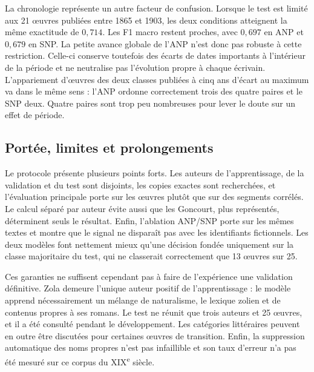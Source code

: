 La chronologie représente un autre facteur de confusion. Lorsque le test est limité aux 21 œuvres publiées entre 1865 et 1903, les deux conditions atteignent la même exactitude de $0{,}714$. Les F1 macro restent proches, avec $0{,}697$ en ANP et $0{,}679$ en SNP. La petite avance globale de l'ANP n'est donc pas robuste à cette restriction. Celle-ci conserve toutefois des écarts de dates importants à l'intérieur de la période et ne neutralise pas l'évolution propre à chaque écrivain. L'appariement d'œuvres des deux classes publiées à cinq ans d'écart au maximum va dans le même sens : l'ANP ordonne correctement trois des quatre paires et le SNP deux. Quatre paires sont trop peu nombreuses pour lever le doute sur un effet de période.

\subsection{Portée, limites et prolongements}

Le protocole présente plusieurs points forts. Les auteurs de l'apprentissage, de la validation et du test sont disjoints, les copies exactes sont recherchées, et l'évaluation principale porte sur les œuvres plutôt que sur des segments corrélés. Le calcul séparé par auteur évite aussi que les Goncourt, plus représentés, déterminent seuls le résultat. Enfin, l'ablation ANP/SNP porte sur les mêmes textes et montre que le signal ne disparaît pas avec les identifiants fictionnels. Les deux modèles font nettement mieux qu'une décision fondée uniquement sur la classe majoritaire du test, qui ne classerait correctement que 13 œuvres sur 25.

Ces garanties ne suffisent cependant pas à faire de l'expérience une validation définitive. Zola demeure l'unique auteur positif de l'apprentissage : le modèle apprend nécessairement un mélange de naturalisme, le lexique zolien et de contenus propres à ses romans. Le test ne réunit que trois auteurs et 25 œuvres, et il a été consulté pendant le développement. Les catégories littéraires peuvent en outre être discutées pour certaines œuvres de transition. Enfin, la suppression automatique des noms propres n'est pas infaillible et son taux d'erreur n'a pas été mesuré sur ce corpus du XIX\textsuperscript{e} siècle.

